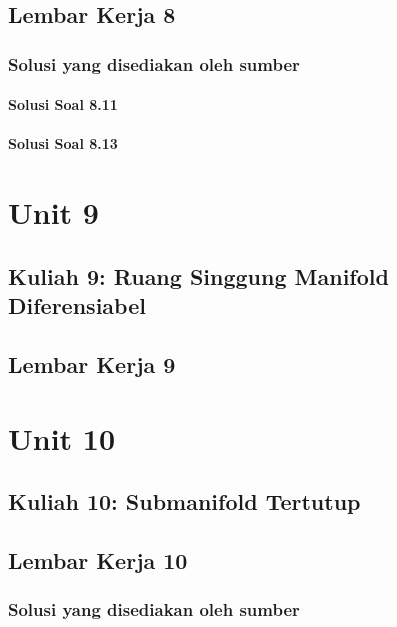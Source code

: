 \documentclass[11pt,a4paper,oneside]{book}
\begin{document}
\chapter{Lembar Kerja 8}


\section*{Solusi yang disediakan oleh sumber}
\subsection*{Solusi Soal 8.11}

\subsection*{Solusi Soal 8.13}


\part{Unit 9}
\chapter[Kuliah 9]{Kuliah 9: Ruang Singgung Manifold Diferensiabel}


\chapter{Lembar Kerja 9}


\part{Unit 10}
\chapter[Kuliah 10]{Kuliah 10: Submanifold Tertutup}


\chapter{Lembar Kerja 10}


\section*{Solusi yang disediakan oleh sumber}
\end{document}
